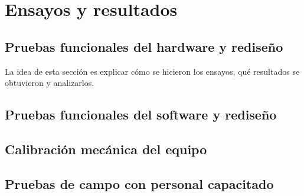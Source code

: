 
\chapter{Ensayos y resultados} %

\label{Chapter4} %


\section{Pruebas funcionales del hardware y rediseño}
\label{sec:pruebasHW}

La idea de esta sección es explicar cómo se hicieron los ensayos, qué resultados se obtuvieron y analizarlos.

\section{Pruebas funcionales del software y rediseño}

\section{Calibración mecánica del equipo}

\section{Pruebas de campo con personal capacitado}